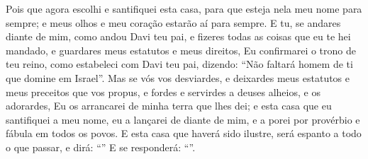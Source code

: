 {{  Pois que agora escolhi e santifiquei esta casa, para que esteja nela meu nome para sempre; e meus olhos e meu coração estarão aí para sempre.
  E tu, se andares diante de mim, como andou Davi teu pai, e fizeres todas as coisas que eu te hei mandado, e guardares meus estatutos e meus direitos, %
  Eu confirmarei o trono de teu reino, como estabeleci com Davi teu pai, dizendo: \enquote{Não faltará homem de ti que domine em Israel}.
  Mas se vós vos desviardes, e deixardes meus estatutos e meus preceitos que vos propus, e fordes e servirdes a deuses alheios, e os adorardes,
  Eu os arrancarei de minha terra que lhes dei; e esta casa que eu santifiquei a meu nome, eu a lançarei de diante de mim, e a porei por provérbio e fábula em todos os povos. %
  E esta casa que haverá sido ilustre, será espanto a todo o que passar, e dirá: \enquote{}
  E se responderá: \enquote{}}.
\par }


